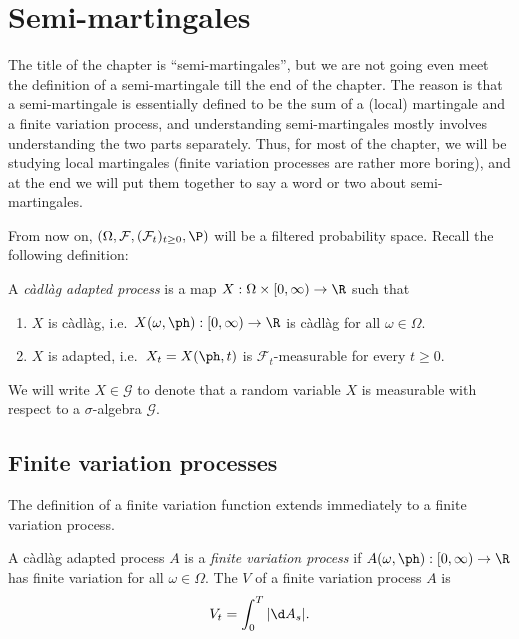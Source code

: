 \documentclass[a4paper]{article}
\begin{document}
\section{Semi-martingales}
The title of the chapter is ``semi-martingales'', but we are not going even meet the definition of a semi-martingale till the end of the chapter. The reason is that a semi-martingale is essentially defined to be the sum of a (local) martingale and a finite variation process, and understanding semi-martingales mostly involves understanding the two parts separately. Thus, for most of the chapter, we will be studying local martingales (finite variation processes are rather more boring), and at the end we will put them together to say a word or two about semi-martingales.

From now on, $(\Omega, \mathcal{F}, (\mathcal{F}_t)_{t \geq 0}, \P)$ will be a filtered probability space. Recall the following definition:

\begin{defi}
  A \emph{c\`adl\`ag adapted process} is a map $X: \Omega \times [0, \infty) \to \R$ such that
  \begin{enumerate}
    \item $X$ is c\`adl\`ag, i.e.\ $X(\omega, \ph): [0, \infty) \to \R$ is c\`adl\`ag for all $\omega \in \Omega$.
    \item $X$ is adapted, i.e.\ $X_t = X(\ph, t) $ is $\mathcal{F}_t$-measurable for every $t \geq 0$.
  \end{enumerate}
\end{defi}

\begin{notation}
  We will write $X \in \mathcal{G}$ to denote that a random variable $X$ is measurable with respect to a $\sigma$-algebra $\mathcal{G}$.
\end{notation}

\subsection{Finite variation processes}
The definition of a finite variation function extends immediately to a finite variation process.
\begin{defi}
  A c\`adl\`ag adapted process $A$ is a \emph{finite variation process} if $A(\omega, \ph): [0, \infty) \to \R$ has finite variation for all $\omega \in \Omega$. The  $V$ of a finite variation process $A$ is
  \[
    V_t = \int_0^T |\d A_s|.
  \]
\end{defi}
\end{document}
